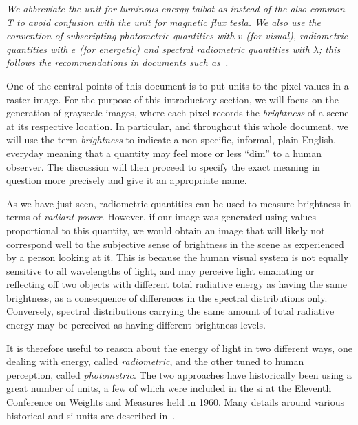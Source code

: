 \begin{table}
{}
\vskip 1mm
{\footnotesize\it We abbreviate the unit for luminous energy \textit{talbot} as
\unit{\talbot} instead of the also common \unit{\tesla} to avoid confusion with the
unit for magnetic flux \textit{tesla}.
We also use the convention of subscripting photometric quantities
with $v$ (for \textit{visual}), radiometric quantities with $e$ (for
\textit{energetic}) and spectral radiometric quantities with $\lambda$;
this follows the recommendations in documents such as~\cite{united1967usa}.}
\end{table}

One of the central points of this document is to put units to the pixel values in a raster image. 
For the purpose of this introductory section, we will focus on the generation of grayscale images, where each pixel records the \textsl{\gls{brightness}} of a scene at its respective location. In particular, and throughout this whole document, we will use the term \textsl{brightness} to indicate a non-specific, informal, plain-English, everyday meaning that a quantity may feel more or less ``dim'' to a human observer. 
The discussion will then proceed to specify the exact meaning in question more precisely and give it an appropriate name.

As we have just seen, radiometric quantities can be used to measure brightness in terms of \emph{radiant power}.
However, if our image was generated using values proportional to this quantity,
we would obtain an image that will likely not correspond well to the subjective sense of brightness in the scene as experienced by a person looking at it. 
This is because the human visual system is not equally sensitive to all wavelengths
of light, and may perceive light emanating or reflecting off two objects with different total radiative energy as having the same brightness, as a consequence of differences in the spectral distributions only. 
Conversely,  spectral distributions carrying the same amount
of total radiative energy may be perceived as having different brightness levels.

It is therefore useful to reason about the energy of light in two
different ways, one dealing with energy, called \textsl{radiometric}, and the
other tuned to human perception, called \textsl{photometric}. The two approaches
have historically been using a great number of units, a few of which were
included in the \gls{si} at the Eleventh Conference on Weights and Measures
held in 1960.  Many details around various historical and \gls{si} units are
described in~\cite{Meyer-Arendt:68}.

